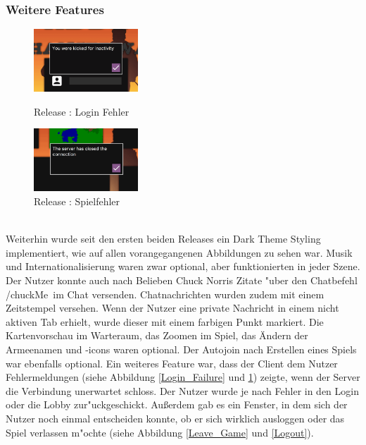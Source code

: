 \documentclass[12pt, titlepage]{scrartcl}
\newcommand{\RN}[1]{%
	\textup{\uppercase\expandafter{\romannumeral#1}}%
}
\begin{document}
		    \subsubsection{Weitere Features}
		        \begin{figure}
                    \begin{center}
                        \includegraphics[width=0.35\textwidth]{images/old_state/additional/LoginFailure.png}
                        \caption{Release \RN{2}: Login Fehler}
                        \label{Login_Failure}
                    \end{center}
                    \begin{center}
                        \includegraphics[width=0.35\textwidth]{images/old_state/additional/WaitingRoomFailure.png}
                        \caption{Release \RN{2}: Spielfehler}
                        \label{Game_Failure}
                    \end{center}
                \end{figure}
		        \ \\ Weiterhin wurde seit den ersten beiden Releases ein Dark Theme Styling implementiert, wie auf allen vorangegangenen Abbildungen zu sehen war. Musik und Internationalisierung waren zwar optional, aber funktionierten in jeder Szene. Der Nutzer konnte auch nach Belieben Chuck Norris Zitate "uber den Chatbefehl \glqq /chuckMe\grqq\ im Chat versenden. Chatnachrichten wurden zudem mit einem Zeitstempel versehen. Wenn der Nutzer eine private Nachricht in einem nicht aktiven Tab erhielt, wurde dieser mit einem farbigen Punkt markiert. Die Kartenvorschau im Warteraum, das Zoomen im Spiel, das \"Andern der Armeenamen und -icons waren optional. Der Autojoin nach Erstellen eines Spiels war ebenfalls optional. Ein weiteres Feature war, dass der Client dem Nutzer Fehlermeldungen (siehe Abbildung \ref{Login_Failure} und \ref{Game_Failure}) zeigte, wenn der Server die Verbindung unerwartet schloss. Der Nutzer wurde je nach Fehler in den Login oder die Lobby zur"uckgeschickt. Au{\ss}erdem gab es ein Fenster, in dem sich der Nutzer noch einmal entscheiden konnte, ob er sich wirklich ausloggen oder das Spiel verlassen m"ochte (siehe Abbildung \ref{Leave_Game} und \ref{Logout}). \\
\end{document}

